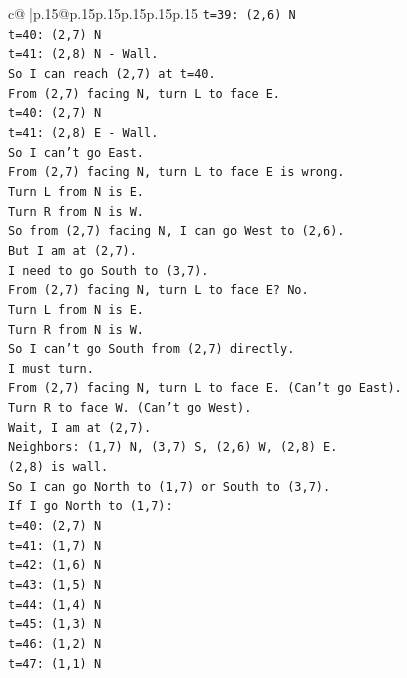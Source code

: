\documentclass{article}
\begin{document}
{\begin{supertabular}{c@{$\;$}|p{.15\linewidth}@{}p{.15\linewidth}p{.15\linewidth}p{.15\linewidth}p{.15\linewidth}p{.15\linewidth}}
{{{\texttt{t=39: (2,6) N} \\
\texttt{t=40: (2,7) N} \\
\texttt{t=41: (2,8) N {-} Wall.} \\
\texttt{So I can reach (2,7) at t=40.} \\
\texttt{From (2,7) facing N, turn L to face E.} \\
\texttt{t=40: (2,7) N} \\
\texttt{t=41: (2,8) E {-} Wall.} \\
\texttt{So I can't go East.} \\
\texttt{From (2,7) facing N, turn L to face E is wrong.} \\
\texttt{Turn L from N is E.} \\
\texttt{Turn R from N is W.} \\
\texttt{So from (2,7) facing N, I can go West to (2,6).} \\
\texttt{But I am at (2,7).} \\
\texttt{I need to go South to (3,7).} \\
\texttt{From (2,7) facing N, turn L to face E? No.} \\
\texttt{Turn L from N is E.} \\
\texttt{Turn R from N is W.} \\
\texttt{So I can't go South from (2,7) directly.} \\
\texttt{I must turn.} \\
\texttt{From (2,7) facing N, turn L to face E. (Can't go East).} \\
\texttt{Turn R to face W. (Can't go West).} \\
\texttt{Wait, I am at (2,7).} \\
\texttt{Neighbors: (1,7) N, (3,7) S, (2,6) W, (2,8) E.} \\
\texttt{(2,8) is wall.} \\
\texttt{So I can go North to (1,7) or South to (3,7).} \\
\texttt{If I go North to (1,7):} \\
\texttt{t=40: (2,7) N} \\
\texttt{t=41: (1,7) N} \\
\texttt{t=42: (1,6) N} \\
\texttt{t=43: (1,5) N} \\
\texttt{t=44: (1,4) N} \\
\texttt{t=45: (1,3) N} \\
\texttt{t=46: (1,2) N} \\
\texttt{t=47: (1,1) N} \\
}}}
\end{supertabular}}
\end{document}
